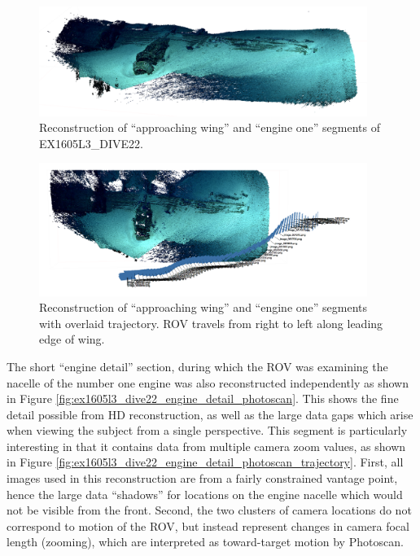 \documentclass[letterpaper,12pt]{article}
\begin{document}
\begin{figure}
    \centering
    \includegraphics[width=0.95\textwidth]{images/approaching_wing_photoscan.png}
    \caption{Reconstruction of ``approaching wing'' and ``engine one'' segments of EX1605L3\_DIVE22.}
    \label{fig:ex1605l3_dive22_wing_photoscan}
\end{figure}

\begin{figure}
    \centering
    \includegraphics[width=0.95\textwidth]{images/approaching_wing_photoscan_trajectory.png}
    \caption{Reconstruction of ``approaching wing'' and ``engine one'' segments with overlaid trajectory.  ROV travels from right to left along leading edge of wing.}
    \label{fig:ex1605l3_dive22_wing_photoscan_trajectory}
\end{figure}

The short ``engine detail'' section, during which the ROV was examining the nacelle of the number one engine was also reconstructed independently as shown in Figure \ref{fig:ex1605l3_dive22_engine_detail_photoscan}.    This shows the fine detail possible from HD reconstruction, as well as the large data gaps which arise when viewing the subject from a single perspective.   This segment is particularly interesting in that it contains data from multiple camera zoom values, as shown in Figure \ref{fig:ex1605l3_dive22_engine_detail_photoscan_trajectory}.   First, all images used in this reconstruction are from a fairly constrained vantage point, hence the large data ``shadows'' for locations on the engine nacelle which would not be visible from the front.   Second, the two clusters of camera locations do not correspond to motion of the ROV, but instead represent changes in camera focal length (zooming), which are interpreted as toward-target motion by Photoscan.
\end{document}
